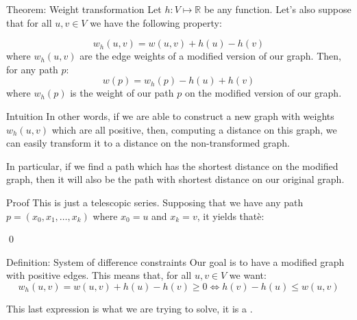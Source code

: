 \documentclass[a4paper]{article}
\begin{document}
\begin{parag}{Theorem: Weight transformation}
    Let $h: V \mapsto \mathbb{R}$ be any function. Let's also suppose that for all $u, v \in V$ we have the following property:

    \[w_h\left(u, v\right) = w\left(u, v\right) + h\left(u\right) - h\left(v\right)\]
    where $w_h\left(u, v\right)$ are the edge weights of a modified version of our graph. Then, for any path $p$:
    \[w\left(p\right) = w_h\left(p\right) - h\left(u\right) + h\left(v\right)\]
    where $w_h\left(p\right)$ is the weight of our path $p$ on the modified version of our graph.

    \begin{subparag}{Intuition}
        In other words, if we are able to construct a new graph with weights $w_h\left(u, v\right)$ which are all positive, then, computing a distance on this graph, we can easily transform it to a distance on the non-transformed graph.

        In particular, if we find a path which has the shortest distance on the modified graph, then it will also be the path with shortest distance on our original graph.
    \end{subparag}

    \begin{subparag}{Proof}
        This is just a telescopic series. Supposing that we have any path $p = \left(x_0, x_1, \ldots, x_k\right)$ where $x_0 = u$ and $x_k = v$, it yields thatè:

        \qed
    \end{subparag}
\end{parag}

\begin{parag}{Definition: System of difference constraints}
    Our goal is to have a modified graph with positive edges. This means that, for all $u, v \in V$ we want: 
    \[w_h\left(u,v\right) = w\left(u, v\right) + h\left(u\right) - h\left(v\right) \geq 0 \iff h\left(v\right) - h\left(u\right) \leq w\left(u, v\right)\]
    
    This last expression is what we are trying to solve, it is a .
\end{parag}
\end{document}
